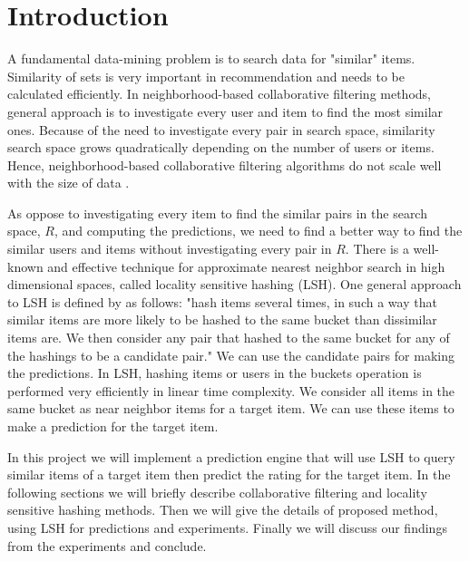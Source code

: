 \documentclass[conference]{IEEEtran}
\begin{document}




%
\IEEEpeerreviewmaketitle


\section{Introduction}

A fundamental data-mining problem is to search data for "similar" items. 
Similarity of sets is very important in recommendation and needs to be
calculated efficiently. In neighborhood-based collaborative filtering methods, 
general approach is to investigate every user and item to find the most similar 
ones. Because of the need to investigate every pair in search space, similarity 
search space grows quadratically depending on the number of users or items. 
Hence, neighborhood-based collaborative filtering algorithms do not scale well 
with the size of data \cite {DBLP:reference/rsh/DesrosiersK11}.

As oppose to investigating every item to find the similar pairs in the 
search space, $R$, and computing the predictions, we need to find a better 
way to find the similar users and items without investigating every pair in $R$. 
There is a well-known and effective technique for approximate nearest neighbor 
search in high dimensional spaces, called locality sensitive hashing (LSH). 
One general approach to LSH is defined by \cite{Rajaraman:2011:MMD:2124405} 
as follows: "hash items several times, in such a way that similar items are 
more likely to be hashed to the same bucket than dissimilar items are. We then 
consider any pair that hashed to the same bucket for any of the hashings to be 
a candidate pair." We can use the candidate pairs for making the predictions. 
In LSH, hashing items or users in the buckets operation is performed very 
efficiently in linear time complexity. We consider all items in the same bucket 
as near neighbor items for a target item. We can use these items to make a 
prediction for the target item.

In this project we will implement a prediction engine that will use LSH to 
query similar items of a target item then predict the rating for the target 
item. In the following sections we will briefly describe collaborative 
filtering and locality sensitive hashing methods. Then we will give the details 
of proposed method, using LSH for predictions and experiments. Finally we will 
discuss our findings from the experiments and conclude. 
\end{document}
